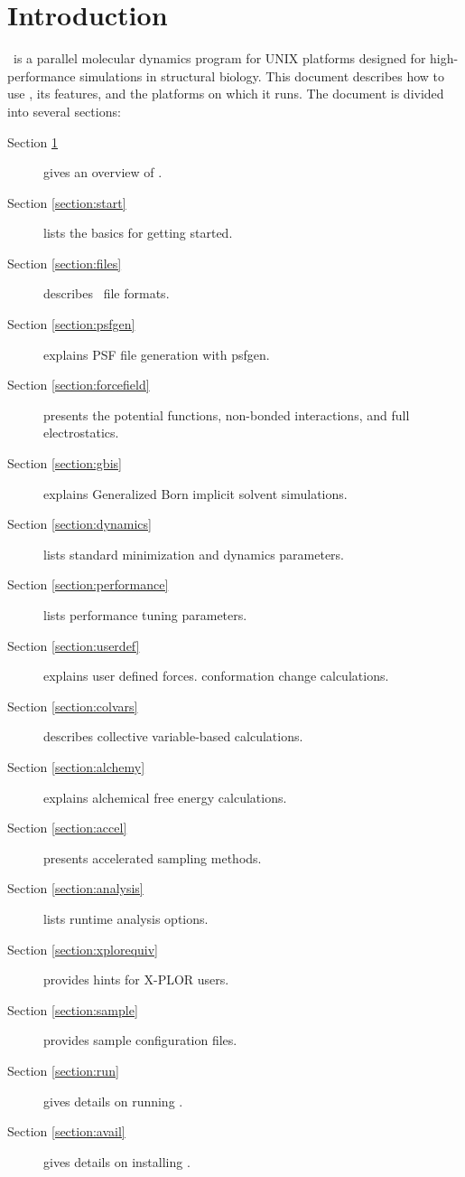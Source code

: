 

\section{Introduction}
\label{section:intro}

\NAMD\ is a parallel molecular dynamics program for UNIX 
platforms designed for high-performance 
simulations in structural biology.  This document describes how to use 
\NAMD, its features, and the platforms on which it runs.
The document is divided into several sections:
\begin{description}
\item[Section \ref{section:intro}] gives an overview of \NAMD.
\item[Section \ref{section:start}] lists the basics for getting started.
\item[Section \ref{section:files}] describes \NAMD\ file formats.
\item[Section \ref{section:psfgen}] explains PSF file generation with psfgen.
\item[Section \ref{section:forcefield}] presents the potential functions,
non-bonded interactions, and full electrostatics.
\item[Section \ref{section:gbis}] explains Generalized Born implicit solvent simulations. 
\item[Section \ref{section:dynamics}] lists standard minimization
and dynamics parameters.
\item[Section \ref{section:performance}] lists performance tuning parameters.
\item[Section \ref{section:userdef}] explains user defined forces.
conformation change calculations.
\item[Section \ref{section:colvars}] describes collective
variable-based calculations.
\item[Section \ref{section:alchemy}] explains alchemical free energy calculations.
\item[Section \ref{section:accel}] presents accelerated sampling methods.
\item[Section \ref{section:analysis}] lists runtime analysis options.
\item[Section \ref{section:xplorequiv}] provides hints for X-PLOR users.
\item[Section \ref{section:sample}] provides sample configuration files.
\item[Section \ref{section:run}] gives details on running \NAMD.
\item[Section \ref{section:avail}] gives details on installing \NAMD.
\end{description}


